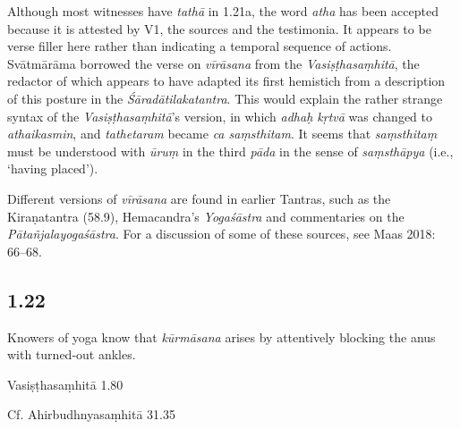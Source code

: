 \begin{ekdosis}
\begin{testimonia}[hp01_021]
\end{testimonia}

\begin{philcomm}[hp01_021]   
Although most witnesses have \emph{tathā} in 1.21a, the word \emph{atha} has been accepted because it is attested by V1, the sources and the testimonia. It appears to be verse filler here rather than indicating a temporal sequence of actions. Svātmārāma borrowed the verse on \emph{vīrāsana} from the \emph{Vasiṣṭhasaṃhitā}, the redactor of which appears to have adapted its first hemistich from a description of this posture in the \emph{Śāradātilakatantra}. This would explain the rather strange syntax of the \emph{Vasiṣṭhasaṃhitā}’s version, in which \emph{adhaḥ kṛtvā} was changed to \emph{athaikasmin}, and \emph{tathetaram} became \emph{ca saṃsthitam}. It seems that \emph{saṃsthitaṃ} must be understood with \emph{ūruṃ} in the third \emph{pāda} in the sense of \emph{saṃsthāpya} (i.e., ‘having placed’).

Different versions of \emph{vīrāsana} are found in earlier Tantras, such as the Kiraṇatantra (58.9), Hemacandra’s \emph{Yogaśāstra} and commentaries on the \emph{Pātañjalayogaśāstra}. For a discussion of some of these sources, see Maas 2018: 66–68.
\end{philcomm}

\subsection*{1.22}
\begin{translation}[hp01_022]
Knowers of yoga know that \emph{kūrmāsana} arises by attentively blocking the anus with turned-out ankles.
\end{translation}

\begin{sources}[hp01_022]
Vasiṣṭhasaṃhitā 1.80

\begin{versinnote}
\end{versinnote}

Cf. Ahirbudhnyasaṃhitā 31.35

\begin{versinnote}
\end{versinnote}


\end{sources}
\end{ekdosis}
